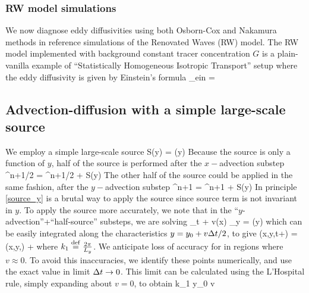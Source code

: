 \documentclass[11pt]{article}
\begin{document}
\subsubsection{RW model simulations}
We now diagnose eddy diffusivities using both Osborn-Cox and Nakamura methods in reference simulations of the Renovated Waves (RW) model.  The RW model implemented with background constant tracer concentration $G$ is a plain-vanilla example of ``Statistically Homogeneous Isotropic Transport'' setup where the eddy diffusivity is given by Einstein's formula
\beq
\label{einstein_eddy_diffusivity}
\kappa_{ein} = \per
\eeq 







\subsection{Advection-diffusion with a simple large-scale source}

We employ a simple large-scale source
\beq
S(y) = \cos \left(y\right)\per
\eeq
Because the source is only a function of $y$, half of the source is performed after the $x-$advection
substep
\beq
\label{source_x}
\vth^{n+1/2} = \vth^{n+1/2} +  S(y)\per
\eeq
The other half of the source could be applied in the same fashion, after the $y-$advection
substep
\beq
\label{source_y}
\vth^{n+1} = \vth^{n+1} +  S(y)\per
\eeq
In principle \eqref{source_y} is a brutal way to apply the source since source term is not invariant in $y$.
To apply the source more accurately, we note that in the ``$y$-advection''+``half-source'' substeps, we are
solving
\beq
\vth_t + v(x) \vth_y = \cos \left(y\right)\com
\eeq
which can be easily integrated along the characteristics $y = y_0 + v \Delta t/2$, to give
\beq
\label{adv_source_y}
\vth(x,y,t+\dt) = \vth(x,y,\dt) + \per
\eeq
where $k_1 \stackrel{\mathrm{def}}{=} \frac{2\pi}{L_y}$. We anticipate loss of accuracy for in regions where $v\approx 0$. To
avoid this inaccuracies, we identify these points numerically, and use the exact value in limit $\Delta t \to 0$.
This limit can be calculated using the L'Hospital rule, simply expanding about $v=0$, to obtain
\beq
{} \to {}\cos k_1 y_0 \qquad {}
\qquad v \per
\eeq
\end{document}
